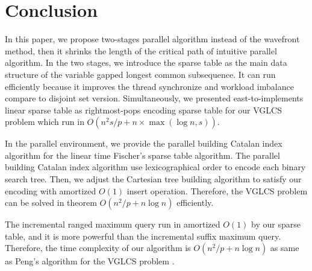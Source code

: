 \section{Conclusion}
\label{sec:Conclusion}

In this paper, we propose two-stages parallel algorithm instead of the
wavefront method, then it shrinks the length of the critical path of
intuitive parallel algorithm.  In the two stages, we introduce the
sparse table as the main data structure of the variable gapped longest
common subsequence.  It can run efficiently because it improves the
thread synchronize and workload imbalance compare to disjoint set
version.  Simultaneously, we presented east-to-implements linear sparse
table as rightmost-pops encoding sparse table for our VGLCS problem
which run in $O(n^2 s / p + n \times \max(\log n, s))$.

In the parallel environment, we provide the parallel building Catalan
index algorithm for the linear time Fischer's sparse table algorithm.
The parallel building Catalan index algorithm use lexicographical order
to encode each binary search tree.  Then, we adjust the Cartesian tree
building algorithm to satisfy our encoding with amortized $O(1)$ insert
operation.  Therefore, the VGLCS problem can be solved in theorem $O(n^2
/ p + n \log n)$ efficiently.

The incremental ranged maximum query run in amortized $O(1)$ by our
sparse table, and it is more powerful than the incremental suffix
maximum query.  Therefore, the time complexity of our algorithm is
$O(n^2 / p + n \log n)$ as same as Peng's algorithm for the VGLCS
problem .
